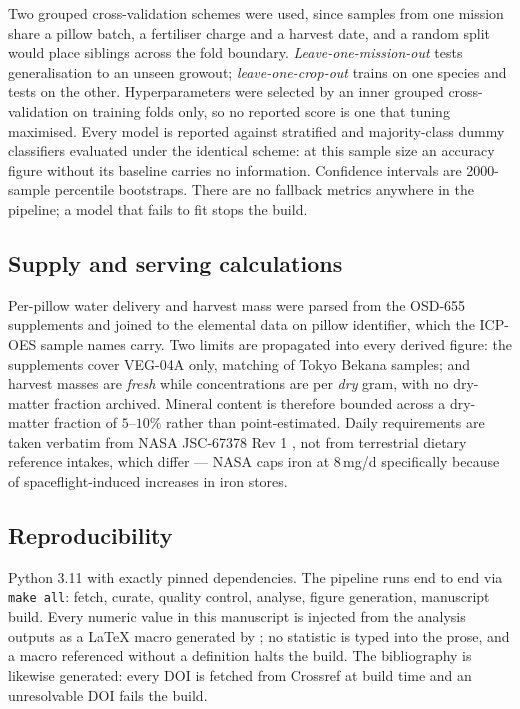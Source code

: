Two grouped cross-validation schemes were used, since samples from one mission
share a pillow batch, a fertiliser charge and a harvest date, and a random split
would place siblings across the fold boundary. \emph{Leave-one-mission-out}
tests generalisation to an unseen growout; \emph{leave-one-crop-out} trains on
one species and tests on the other. Hyperparameters were selected by an inner
grouped cross-validation on training folds only, so no reported score is one
that tuning maximised. Every model is reported against stratified and
majority-class dummy classifiers evaluated under the identical scheme: at this
sample size an accuracy figure without its baseline carries no information.
Confidence intervals are 2000-sample percentile bootstraps. There are no
fallback metrics anywhere in the pipeline; a model that fails to fit stops the
build.

\subsection{Supply and serving calculations}

Per-pillow water delivery and harvest mass were parsed from the OSD-655
supplements and joined to the elemental data on pillow identifier, which the
ICP-OES sample names carry. Two limits are propagated into every derived figure:
the supplements cover VEG-04A only, matching \SupplyMatched{} of
\SupplyTotal{} Tokyo Bekana samples; and harvest masses are \emph{fresh} while
concentrations are per \emph{dry} gram, with no dry-matter fraction archived.
Mineral content is therefore bounded across a dry-matter fraction of
$5$--$10\%$ rather than point-estimated. Daily requirements are taken verbatim
from NASA JSC-67378 Rev 1 \citep{jsc67378}, not from terrestrial dietary
reference intakes, which differ --- NASA caps iron at 8\,mg/d specifically
because of spaceflight-induced increases in iron stores.

\subsection{Reproducibility}

Python 3.11 with exactly pinned dependencies. The pipeline runs end to end via
\texttt{make all}: fetch, curate, quality control, analyse, figure generation,
manuscript build. Every numeric value in this manuscript is injected from the
analysis outputs as a \LaTeX{} macro generated by
; no statistic is typed into the prose, and a
macro referenced without a definition halts the build. The bibliography is
likewise generated: every DOI is fetched from Crossref at build time and an
unresolvable DOI fails the build.
